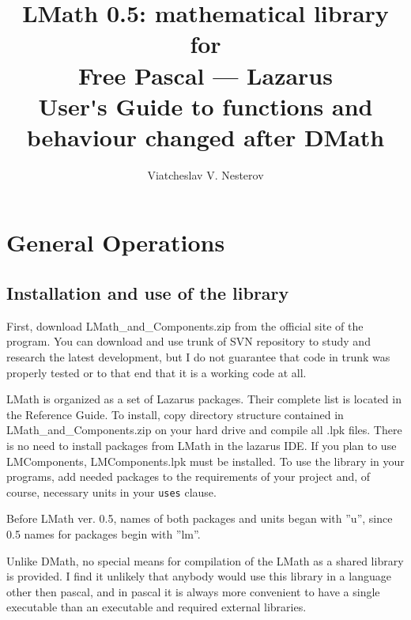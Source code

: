 \documentclass[12pt,a4paper,oneside]{report}
\newcommand{\code}[1]{\texttt{#1}}
\begin{document}
\title{LMath 0.5: mathematical library for\\ Free Pascal --- Lazarus\\
{\Large User\'{}s Guide to functions and behaviour changed after DMath}}
\author{Viatcheslav V. Nesterov}
\maketitle
\newpage
\label{toc}\tableofcontents
\newpage
\newlength{\tmplength}
\chapter{General Operations}
\section{Installation and use of the library}
First, download LMath\_and\_Components.zip from the official site of the program. 
You can download and use trunk of SVN repository to study and research the latest development, but I do not guarantee that code in trunk was properly tested or to that end that it is a working code at all. 

LMath is organized as a set of Lazarus packages. Their complete list is located in the Reference Guide. To install, copy directory structure contained in LMath\_and\_Components.zip on your hard drive and compile all .lpk files. There is no need to install packages from LMath in the lazarus IDE. If you plan to use LMComponents, LMComponents.lpk must be installed. To use the library in your programs, add needed packages to the requirements of your project and, of course, necessary units in your \code{uses} clause.

Before LMath ver. 0.5, names of both packages and units began with ''u'', since 0.5 names for packages begin with ''lm''. 

Unlike DMath, no special means for compilation of the LMath as a shared library is provided. I find it unlikely that anybody would use this library in a language other then pascal, and in pascal it is always more convenient to have a single executable than an executable and required external libraries.
\end{document}
